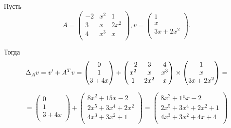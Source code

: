 \begin{example}
	Пусть
	\begin{equation*}
		A = 
		\begin{pmatrix}
			-2 & x^2 & 1 \\
			3 & x & 2x^2 \\
			4 & x^3 & x \\
		\end{pmatrix},
		v =
		\begin{pmatrix}
			1 \\
			x \\
			3x + 2x^2 \\
		\end{pmatrix}.
	\end{equation*}
    
	Тогда
	\begin{equation*}
		\text{$ \Delta_A^{} v $} = v' + A^T v = 
		\begin{pmatrix}
			0 \\
			1 \\
			3 + 4x \\
		\end{pmatrix}
        +
        \begin{pmatrix}
			-2 & 3 & 4 \\
			x^2 & x & x^3 \\
			1 & 2x^2 & x \\
		\end{pmatrix}
        \times
        \begin{pmatrix}
			1 \\
			x \\
			3x + 2x^2 \\
		\end{pmatrix}
        =
    \end{equation*}
    
    \begin{equation*}
        =
        \begin{pmatrix}
			0 \\
			1 \\
			3 + 4x \\
		\end{pmatrix}
        +
		\begin{pmatrix}
			8x^2 + 15x - 2 \\
			2x^5 + 3x^4 + 2x^2 \\
			4x^3 + 3x^2  + 1 \\
		\end{pmatrix} =
		\begin{pmatrix}
			8x^2 + 15x - 2 \\
			2x^5 + 3x^4 + 2x^2 + 1\\
			4x^3 + 3x^2 + 4x + 4 \\
		\end{pmatrix}
	\end{equation*}
\end{example}
\bigskip

